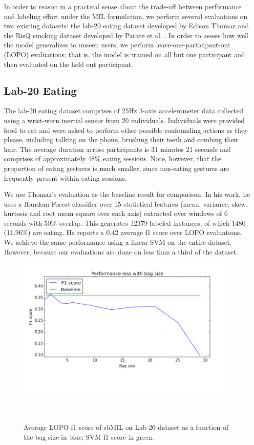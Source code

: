 \documentclass{sigchi}
\begin{document}
In order to reason in a practical sense about the trade-off between performance and labeling effort under the MIL formulation, we perform several evaluations on two existing datasets: the lab-20 eating dataset developed by Edison Thomaz \cite{Thomaz:2015} and the RisQ smoking dataset developed by Parate et al. \cite{Parate:2014}. In order to assess how well the model generalizes to unseen users, we perform leave-one-participant-out (LOPO) evaluations; that is, the model is trained on all but one participant and then evaluated on the held out participant.

\subsection{Lab-20 Eating}

The lab-20 eating dataset comprises of 25Hz 3-axis accelerometer data collected using a wrist-worn inertial sensor from 20 individuals. Individuals were provided food to eat and were asked to perform other possible confounding actions as they please, including talking on the phone, brushing their teeth and combing their hair. The average duration across participants is 31 minutes 21 seconds and comprises of approximately 48\% eating sessions. Note, however, that the proportion of eating gestures is much smaller, since non-eating gestures are frequently present within eating sessions.

We use Thomaz's evaluation as the baseline result for comparison. In his work, he uses a Random Forest classifier over 15 statistical features (mean, variance, skew, kurtosis and root mean square over each axis) extracted over windows of 6 seconds with 50\% overlap. This generates 12379 labeled instances, of which 1480 (11.96\%) are eating. He reports a 0.42 average f1 score over LOPO evaluations. We achieve the same performance using a linear SVM on the entire dataset. However, because our evaluations are done on less than a third of the dataset.

\begin{figure}
\centering
  \includegraphics[width=0.9\columnwidth]{figures/sbMIL_bag_size2}
  \caption{Average LOPO f1 score of sbMIL on Lab-20 dataset as a function of the bag size in blue; SVM f1 score in green.}~\label{fig:figure1}
\end{figure}
\end{document}
